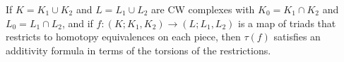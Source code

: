 If $K = K_1 \cup K_2$ and $L = L_1 \cup L_2$ are CW complexes with $K_0 = K_1 \cap K_2$ and $L_0 = L_1 \cap L_2$, and if $f: (K; K_1, K_2) \to (L; L_1, L_2)$ is a map of triads that restricts to homotopy equivalences on each piece, then $\tau(f)$ satisfies an additivity formula in terms of the torsions of the restrictions.
